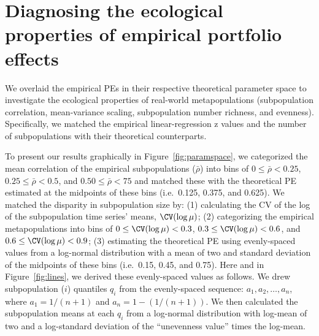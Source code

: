 \section{Diagnosing the ecological properties of empirical portfolio effects}

We overlaid the empirical PEs in their respective theoretical parameter space
to investigate the ecological properties of real-world metapopulations
(subpopulation correlation, mean-variance scaling, subpopulation number
richness, and evenness). Specifically, we matched the empirical
linear-regression z values and the number of subpopulations with their
theoretical counterparts.

To present our results graphically in Figure~\ref{fig:paramspace}, we categorized
the mean correlation of the empirical subpopulations ($\bar{\rho}$) into bins of
$0 \le \bar{\rho} < 0.25$, $0.25 \le \bar{\rho} < 0.5$, and $0.50 \le \bar{\rho}
< 75$ and matched these with the theoretical PE estimated at the midpoints of
these bins (i.e.\ 0.125, 0.375, and 0.625).  We matched the disparity in
subpopulation size by: (1) calculating the CV of the log of the subpopulation
time series' means, $\CV(\log\mu)$; (2) categorizing the empirical
metapopulations into bins of $0 \le \CV(\log\mu) < 0.3$, $0.3 \le \CV(\log\mu) <
0.6$, and $0.6 \le \CV(\log\mu) < 0.9$; (3) estimating the theoretical PE using
evenly-spaced values from a log-normal distribution with a mean of two and
standard deviation of the midpoints of these bins (i.e.\ 0.15, 0.45, and 0.75).
Here and in Figure~\ref{fig:lines}, we derived these evenly-spaced values as
follows.
We drew subpopulation ($i$) quantiles $q_i$ from the evenly-spaced sequence:
$a_1, a_2, \ldots, a_n$, where $a_1 = 1/(n+1)$ and $a_n = 1-(1/(n+1))$. We then
calculated the subpopulation means at each $q_i$ from a log-normal distribution
with log-mean of two and a log-standard deviation of the ``unevenness value''
times the log-mean.



\begin{landscape}


  
\end{landscape}
\clearpage


\clearpage

\clearpage

